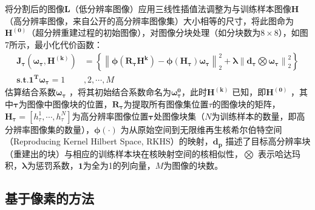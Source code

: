 将分割后的图像$\boldsymbol{L}$（低分辨率图像）应用三线性插值法调整为与训练样本图像$\boldsymbol{H}$（高分辨率图像，来自公开的高分辨率图像集）大小相等的尺寸，将此图命为$\boldsymbol{H^{(0)}}$（超分辨重建过程的初始图像），对图像分块处理（如分块数为$8\times8$），如图7所示，最小化代价函数：
\begin{equation}
 \label{eq8}
 \begin{split}
   \boldsymbol{J_{\tau }(\omega _{\tau },H^{(k)})} & =\left \{ \left \| \boldsymbol{\phi (R_{\tau }H^{k})}-\boldsymbol{\phi (H_{\tau })\omega _{\tau }} \right \| _{2}^{2}+\boldsymbol{\lambda} \left \| \boldsymbol{d_{\tau }}\bigotimes \boldsymbol{\omega _{\tau }} \right \|_{2}^{2}\right \} \\
   \boldsymbol{s.t. 1^{T}\omega _{\tau }}= 1 & ,2,\cdots ,M
 \end{split}
\end{equation}
估算结合系数$\boldsymbol{\omega _{\tau }}$ ，将其初始结合系数命名为$\boldsymbol{\omega_{\tau }^{0}}$，此时$\boldsymbol{H^{(k)}}$ 已知，即$\boldsymbol{H^{(0)}}$ ，其中$\boldsymbol{\tau}$为图像中图像块的位置，$\boldsymbol{R_{\tau }}$为提取所有图像集位置$\tau$的图像块的矩阵， $\boldsymbol{H_{\tau }}=\left [ h_{\tau }^{1},\cdots ,h_{\tau }^{N} \right ]$为高分辨率图像位置$\boldsymbol{\tau}$处图像块集（$N$为训练样本的数量，即高分辨率图像集的数量），$\boldsymbol{\phi (\cdot )}$ 为从原始空间到无限维再生核希尔伯特空间（Reproducing Kernel Hilbert Space, RKHS）的映射，$\boldsymbol{d_{p}}$ 描述了目标高分辨率块（重建出的块）与相应的训练样本块在核映射空间的核相似性，$\bigotimes$ 表示哈达玛积，$\boldsymbol{\lambda}$为惩罚系数，$\boldsymbol{1}$为全为1的列向量，$M$为图像的块数。

\subsection{基于像素的方法}

